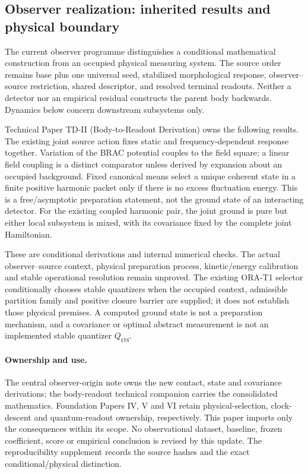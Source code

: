 \documentclass[11pt]{article}
\begin{document}
\subsection{Observer realization: inherited results and physical boundary}
\label{sec:observer-update-20260914}
The current observer programme distinguishes a conditional mathematical
construction from an occupied physical measuring system. The source order
remains base plus one universal seed, stabilized morphological response,
observer--source restriction, shared descriptor, and resolved terminal
readouts. Neither a detector nor an empirical residual constructs the parent
body backwards. Dynamics below concern downstream subsystems only.

Technical Paper TD-II (Body-to-Readout Derivation) owns the following
results. The existing joint source action fixes static and frequency-dependent
response together. Variation of the BRAC potential couples to the field
square; a linear field coupling is a distinct comparator unless derived by
expansion about an occupied background. Fixed canonical means select a unique
coherent state in a finite positive harmonic packet only if there is no excess
fluctuation energy. This is a free/asymptotic preparation statement, not the
ground state of an interacting detector. For the existing coupled harmonic
pair, the joint ground is pure but either local subsystem is mixed, with its
covariance fixed by the complete joint Hamiltonian.

These are conditional derivations and internal numerical checks. The actual
observer--source context, physical preparation process, kinetic/energy
calibration and stable operational resolution remain unproved. The existing
ORA-T1 selector conditionally chooses stable quantizers when the occupied
context, admissible partition family and positive closure barrier are supplied;
it does not establish those physical premises. A computed ground state is not
a preparation mechanism, and a covariance or optimal abstract measurement is
not an implemented stable quantizer $Q_{OS}$.

\paragraph{Ownership and use.}
The central observer-origin note owns the new contact, state and covariance
derivations; the body-readout technical companion carries the consolidated
mathematics. Foundation Papers IV, V and VI retain physical-selection,
clock-descent and quantum-readout ownership, respectively. This paper imports
only the consequences within its scope. No observational dataset, baseline,
frozen coefficient, score or empirical conclusion is revised by this update.
The reproducibility supplement records the source hashes and the exact
conditional/physical distinction.
\end{document}
